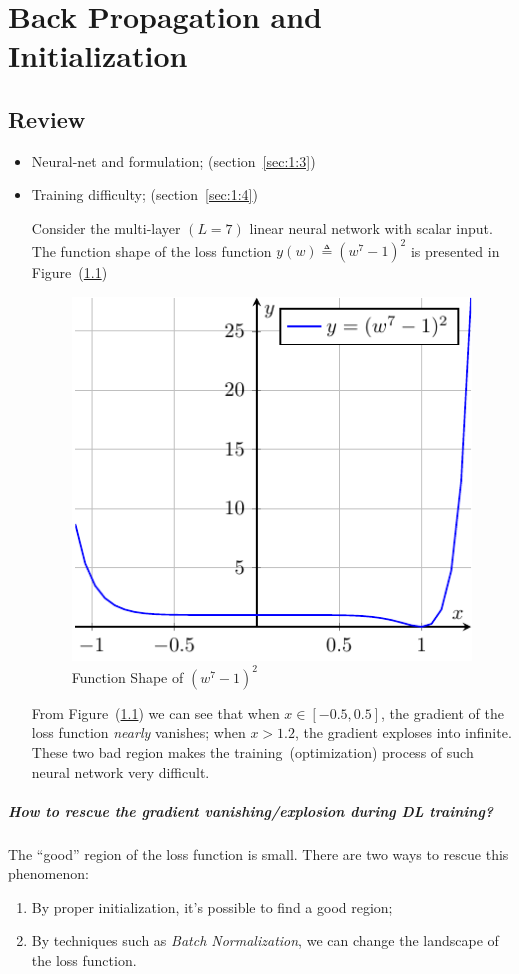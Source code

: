 \chapter{Back Propagation and Initialization}
\section{Review}

\begin{itemize}
\item
Neural-net and formulation; (section~\ref{sec:1:3})
\item
Training difficulty; (section~\ref{sec:1:4})
\begin{example}
Consider the multi-layer $(L=7)$ linear neural network with scalar input. The function shape of the loss function $y(w)\triangleq (w^7-1)^2$ is presented in Figure~(\ref{Fig:2:1})
\begin{figure}[H]
\centering
\includegraphics[height=0.42\textwidth]{First_lecture/figure_1.pdf}
\caption{Function Shape of $(w^7-1)^2$}
\label{Fig:2:1}
\end{figure}
\end{example}
From Figure~(\ref{Fig:2:1}) 
we can see that when $x\in[-0.5,0.5]$, the gradient of the loss function \emph{nearly} vanishes;
when $x>1.2$, the gradient exploses into infinite.
These two bad region makes the training~(optimization) process of such neural network very difficult.
\end{itemize}
\paragraph{How to rescue the gradient vanishing/explosion during DL training?}
The ``good'' region of the loss function is small. There are two ways to rescue this phenomenon:
\begin{enumerate}
\item
By proper initialization, it's possible to find a good region;
\item
By techniques such as \emph{Batch Normalization}, 
we can change the landscape of the loss function.
\end{enumerate}

